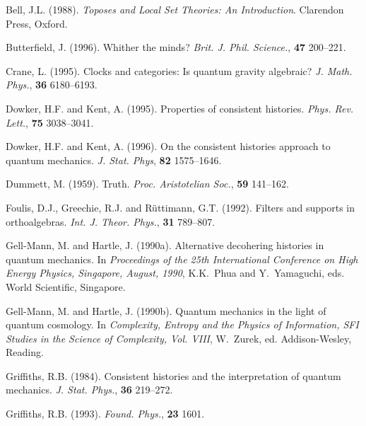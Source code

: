 \begin{trivlist}

\item[] Bell, J.L. (1988).
  {\em Toposes and Local Set Theories: {A}n Introduction}.
  Clarendon Press, Oxford.

\item[] Butterfield, J. (1996). Whither the minds?
  {\em Brit. J. Phil. Science.}, {\bf 47} 200--221.

\item[] Crane, L. (1995).
  Clocks and categories: {I}s quantum gravity algebraic?
  {\em J. Math. Phys.}, {\bf 36 } 6180--6193.

\item[] Dowker, H.F. and Kent, A. (1995).
  Properties of consistent histories.
  {\em Phys. Rev. Lett.}, {\bf 75} 3038--3041.

\item[] Dowker, H.F. and Kent, A. (1996).
  On the consistent histories approach to quantum mechanics.
  {\em J. Stat. Phys}, {\bf 82} 1575--1646.

\item[] Dummett, M. (1959).
  Truth. {\em Proc. Aristotelian Soc.}, {\bf 59} 141--162.

\item[] Foulis, D.J., Greechie, R.J. and R\"uttimann, G.T. (1992).
  Filters and supports in orthoalgebras.
  {\em Int. J. Theor. Phys.}, {\bf 31} 789--807.

\item[] Gell-Mann, M. and Hartle, J. (1990a).
  Alternative decohering histories in quantum mechanics.
  In {\em Proceedings of the 25th International Conference
  on High Energy Physics, Singapore, August, 1990}, K.K.~Phua and
  Y.~Yamaguchi, eds. World Scientific, Singapore.

\item[] Gell-Mann, M. and Hartle, J. (1990b).
  Quantum mechanics in the light of quantum cosmology.
  In  {\em Complexity, Entropy and the Physics of
  Information, SFI Studies in the Science of Complexity, {Vol.
  VIII}}, W.~Zurek, ed. Addison-Wesley, Reading.

\item[] Griffiths, R.B. (1984).
  Consistent histories and the interpretation of quantum mechanics.
  {\em J. Stat. Phys.}, {\bf 36} 219--272.

\item[] Griffiths, R.B. (1993).
  {\em Found. Phys.}, {\bf 23} 1601.


\end{trivlist}
